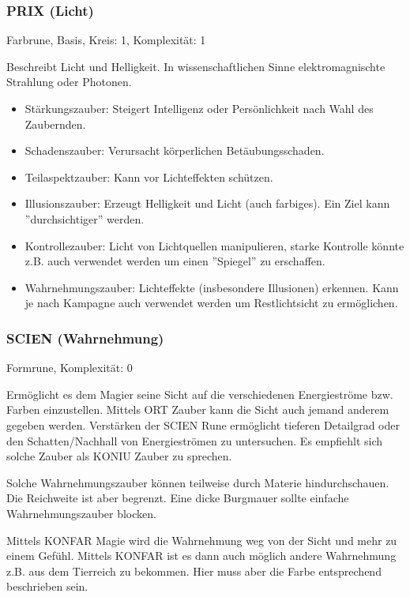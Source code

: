 \documentclass{article}
\begin{document}
\subsubsection{PRIX (Licht)}

Farbrune, Basis, Kreis: 1, Komplexität: 1

Beschreibt Licht und Helligkeit. In wissenschaftlichen Sinne elektromagnischte Strahlung oder Photonen.

\begin{itemize}
\item Stärkungszauber: Steigert Intelligenz oder Persönlichkeit nach Wahl des Zaubernden.
\item Schadenszauber: Verursacht körperlichen Betäubungsschaden.
\item Teilaspektzauber: Kann vor Lichteffekten schützen.
\item Illusionszauber: Erzeugt Helligkeit und Licht (auch farbiges). Ein Ziel kann ''durchsichtiger'' werden.
\item Kontrollezauber: Licht von Lichtquellen manipulieren, starke Kontrolle könnte z.B. auch verwendet werden um einen ''Spiegel'' zu erschaffen.
\item Wahrnehmungszauber: Lichteffekte (insbesondere Illusionen) erkennen. Kann je nach Kampagne auch verwendet werden um Restlichtsicht zu ermöglichen.
\end{itemize}

\subsubsection{SCIEN (Wahrnehmung)}

Formrune, Komplexität: 0

Ermöglicht es dem Magier seine Sicht auf die verschiedenen Energieströme bzw. Farben einzustellen. Mittels ORT
Zauber kann die Sicht auch jemand anderem gegeben werden. Verstärken der SCIEN Rune ermöglicht tieferen Detailgrad
oder den Schatten/Nachhall von Energieströmen zu untersuchen. Es empfiehlt sich solche Zauber als KONIU Zauber zu
sprechen.

Solche Wahrnehmungszauber können teilweise durch Materie hindurchschauen. Die Reichweite ist aber begrenzt. Eine
dicke Burgmauer sollte einfache Wahrnehmungszauber blocken.

Mittels KONFAR Magie wird die Wahrnehmung weg von der Sicht und mehr zu einem Gefühl. Mittels KONFAR ist es dann
auch möglich andere Wahrnehmung z.B. aus dem Tierreich zu bekommen. Hier muss aber die Farbe entsprechend beschrieben
sein.
\end{document}
